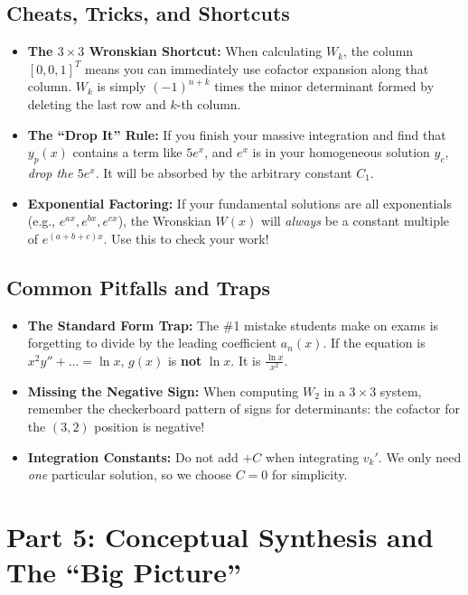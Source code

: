 \documentclass[12pt]{article}
\begin{document}
\subsection{Cheats, Tricks, and Shortcuts}
\begin{itemize}
    \item \textbf{The $3 \times 3$ Wronskian Shortcut:} When calculating $W_k$, the column $[0, 0, 1]^T$ means you can immediately use cofactor expansion along that column. $W_k$ is simply $(-1)^{n+k}$ times the minor determinant formed by deleting the last row and $k$-th column.
    \item \textbf{The ``Drop It'' Rule:} If you finish your massive integration and find that $y_p(x)$ contains a term like $5e^x$, and $e^x$ is in your homogeneous solution $y_c$, \textit{drop the $5e^x$}. It will be absorbed by the arbitrary constant $C_1$.
    \item \textbf{Exponential Factoring:} If your fundamental solutions are all exponentials (e.g., $e^{ax}, e^{bx}, e^{cx}$), the Wronskian $W(x)$ will \textit{always} be a constant multiple of $e^{(a+b+c)x}$. Use this to check your work!
\end{itemize}

\subsection{Common Pitfalls and Traps}
\begin{itemize}
    \item \textbf{The Standard Form Trap:} The \#1 mistake students make on exams is forgetting to divide by the leading coefficient $a_n(x)$. If the equation is $x^2 y'' + \dots = \ln x$, $g(x)$ is \textbf{not} $\ln x$. It is $\frac{\ln x}{x^2}$.
    \item \textbf{Missing the Negative Sign:} When computing $W_2$ in a $3 \times 3$ system, remember the checkerboard pattern of signs for determinants: the cofactor for the $(3,2)$ position is negative!
    \item \textbf{Integration Constants:} Do not add $+C$ when integrating $v_k'$. We only need \textit{one} particular solution, so we choose $C=0$ for simplicity.
\end{itemize}

\newpage
\section{Part 5: Conceptual Synthesis and The ``Big Picture''}
\end{document}
